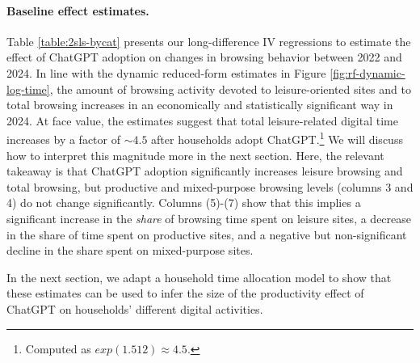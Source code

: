 \documentclass[12pt]{article}
\begin{document}
\paragraph{Baseline effect estimates.}
Table \ref{table:2sls-bycat} presents our long-difference IV regressions to estimate the effect of ChatGPT adoption on changes in browsing behavior between 2022 and 2024. In line with the dynamic reduced-form estimates in  Figure \ref{fig:rf-dynamic-log-time}, the amount of browsing activity devoted to leisure-oriented sites and to total browsing increases in an economically and statistically significant way in 2024. At face value, the estimates suggest that total leisure-related digital time increases by a factor of $\sim 4.5$ after households adopt ChatGPT.\footnote{Computed as $exp(1.512)\approx4.5$.} We will discuss how to interpret this magnitude more in the next section. Here, the relevant takeaway is that ChatGPT adoption significantly increases leisure browsing and total browsing, but productive and mixed-purpose browsing levels (columns 3 and 4) do not change significantly. Columns (5)-(7) show that this implies a significant increase in the \textit{share} of browsing time spent on leisure sites, a decrease in the share of time spent on productive sites, and a negative but non-significant decline in the share spent on mixed-purpose sites.


In the next section, we adapt a household time allocation model to show that these estimates can be used to infer the size of the productivity effect of ChatGPT on households' different digital activities.
\end{document}
